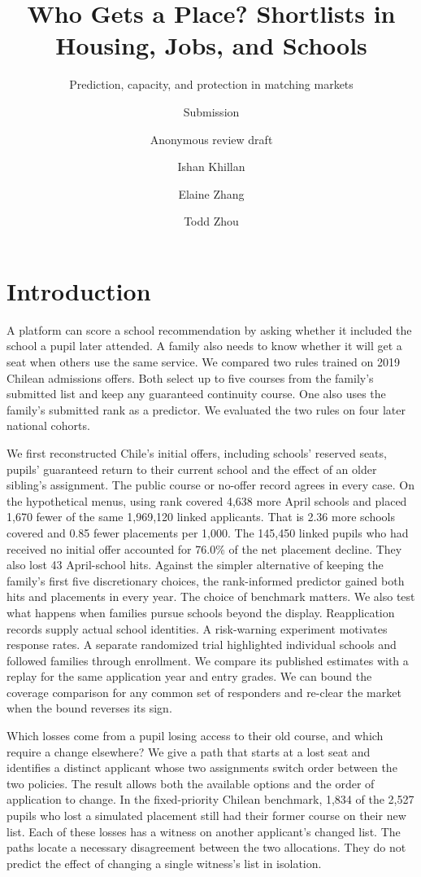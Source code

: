 \documentclass[format=acmsmall,review=false]{acmart}
\title{Who Gets a Place? Shortlists in Housing, Jobs, and Schools}
\subtitle{Prediction, capacity, and protection in matching markets}
\author{Submission \ECPaperNumber}
\author{Anonymous review draft}
\author{Ishan Khillan}
\affiliation{\institution{Harvard University}\city{Cambridge}\state{Massachusetts}\country{USA}}
\author{Elaine Zhang}
\affiliation{\institution{Harvard University}\city{Cambridge}\state{Massachusetts}\country{USA}}
\author{Todd Zhou}
\affiliation{\institution{Harvard University}\city{Cambridge}\state{Massachusetts}\country{USA}}
\begin{document}
\ifdefined\ECReviewCopy
  \begin{titlepage}
  \maketitle
  \thispagestyle{empty}
  \end{titlepage}
\else
  \maketitle
\fi
\section{Introduction}
A platform can score a school recommendation by asking whether it included the school a pupil later attended. A family also needs to know whether it will get a seat when others use the same service. We compared two rules trained on 2019 Chilean admissions offers. Both select up to five courses from the family's submitted list and keep any guaranteed continuity course. One also uses the family's submitted rank as a predictor. We evaluated the two rules on four later national cohorts.

We first reconstructed Chile's initial offers, including schools' reserved seats, pupils' guaranteed return to their current school and the effect of an older sibling's assignment. The public course or no-offer record agrees in every case. On the hypothetical menus, using rank covered 4,638 more April schools and placed 1,670 fewer of the same 1,969,120 linked applicants. That is 2.36 more schools covered and 0.85 fewer placements per 1,000. The 145,450 linked pupils who had received no initial offer accounted for 76.0\% of the net placement decline. They also lost 43 April-school hits. Against the simpler alternative of keeping the family's first five discretionary choices, the rank-informed predictor gained both hits and placements in every year. The choice of benchmark matters. We also test what happens when families pursue schools beyond the display. Reapplication records supply actual school identities. A risk-warning experiment motivates response rates. A separate randomized trial highlighted individual schools and followed families through enrollment. We compare its published estimates with a replay for the same application year and entry grades. We can bound the coverage comparison for any common set of responders and re-clear the market when the bound reverses its sign.

Which losses come from a pupil losing access to their old course, and which require a change elsewhere? We give a path that starts at a lost seat and identifies a distinct applicant whose two assignments switch order between the two policies. The result allows both the available options and the order of application to change. In the fixed-priority Chilean benchmark, 1,834 of the 2,527 pupils who lost a simulated placement still had their former course on their new list. Each of these losses has a witness on another applicant's changed list. The paths locate a necessary disagreement between the two allocations. They do not predict the effect of changing a single witness's list in isolation.
\end{document}
